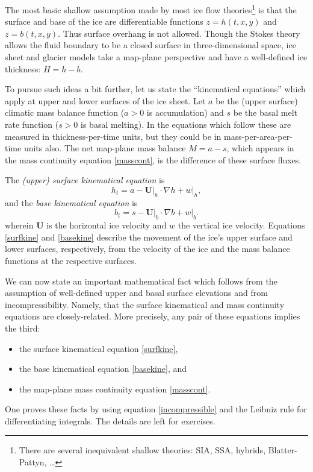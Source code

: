 \documentclass[letterpaper,final,12pt,reqno]{amsart}
\newcommand{\grad}{\nabla}
\begin{document}
The most basic shallow assumption made by most ice flow theories\footnote{There are several inequivalent shallow theories: SIA, SSA, hybrids, Blatter-Pattyn, \dots} is that the surface and base of the ice are differentiable functions $z=h(t,x,y)$ and $z=b(t,x,y)$.  Thus surface overhang is not allowed.  Though the Stokes theory allows the fluid boundary to be a closed surface in three-dimensional space, ice sheet and glacier models take a map-plane perspective and have a well-defined ice thickness: $H=h-b$.

To pursue such ideas a bit further, let us state the ``kinematical equations'' which apply at upper and lower surfaces of the ice sheet.  Let $a$ be the (upper surface) climatic mass balance function ($a>0$ is accumulation) and $s$ be the basal melt rate function ($s>0$ is basal melting).  In the equations which follow these are measured in thickness-per-time units, but they could be in mass-per-area-per-time units also.  The net map-plane mass balance $M=a-s$, which appears in the mass continuity equation \eqref{masscont}, is the difference of these surface fluxes.

The \emph{(upper) surface kinematical equation} is 
\begin{equation}
h_t = a - \mathbf{U}\big|_h \cdot \grad h + w\big|_h,  \label{surfkine}
\end{equation}
and the \emph{base kinematical equation} is
\begin{equation}
b_t = s - \mathbf{U}\big|_b \cdot \grad b + w\big|_b.  \label{basekine}
\end{equation}
wherein $\mathbf{U}$ is the horizontal ice velocity and $w$ the vertical ice velocity.  Equations \eqref{surfkine} and \eqref{basekine} describe the movement of the ice's upper surface and lower surfaces, respectively, from the velocity of the ice and the mass balance functions at the respective surfaces.

We can now state an important mathematical fact which follows from the assumption of well-defined upper and basal surface elevations and from incompressibility.  Namely, that the surface kinematical and mass continuity equations are closely-related.  More precisely, any pair of these equations implies the third:
  \begin{itemize}
  \item the surface kinematical equation \eqref{surfkine},
  \item the base kinematical equation \eqref{basekine}, and
  \item the map-plane mass continuity equation \eqref{masscont}.
  \end{itemize}
One proves these facts by using equation \eqref{incompressible} and the Leibniz rule for differentiating integrals.  The details are left for exercises.
\end{document}
